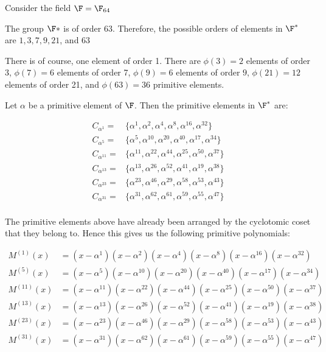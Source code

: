 \documentclass{homework}
\begin{document}
Consider the field $\F = \F_{64}$
\begin{problem}
  The group $\F*$ is of order $63$. Therefore, the possible
  orders of elements in  $\F^*$ are $1,3,7,9,21$, and $63$

  There is of course, one element of order 1. There are $ \phi(3)=2$ elements of
  order 3, $\phi(7) = 6$ elements of order 7, $\phi(9) = 6$ elements of order
  $9$, $\phi(21) = 12$ elements of order 21, and $\phi(63) = 36$ primitive
  elements.

\end{problem}

\begin{problem}
  Let $\alpha$ be a primitive element of $\F$. Then the primitive elements in
  $\F^*$
  are:

  \[
    \begin{aligned}
      C_{\alpha^1} = &\{\alpha^1,\alpha^{2}, \alpha^{4}, \alpha^{8}, \alpha^{16},
      \alpha^{32}\}\\
      C_{\alpha^5} = &\{\alpha^5,\alpha^{10}, \alpha^{20}, \alpha^{40}, \alpha^{17},
      \alpha^{34}\}\\
      C_{\alpha^{11}} = &\{\alpha^{11},\alpha^{22}, \alpha^{44}, \alpha^{25}, \alpha^{50},
      \alpha^{37}\}\\
      C_{\alpha^{13}} = &\{\alpha^{13},\alpha^{26}, \alpha^{52}, \alpha^{41}, \alpha^{19},
      \alpha^{38}\}\\
      C_{\alpha^{23}} = &\{\alpha^{23},\alpha^{46}, \alpha^{29}, \alpha^{58}, \alpha^{53},
      \alpha^{43}\}\\
      C_{\alpha^{31}} = &\{\alpha^{31},\alpha^{62}, \alpha^{61}, \alpha^{59}, \alpha^{55},
      \alpha^{47}\}\\
    \end{aligned}
  \]

  The primitive elements above have already been arranged by the cyclotomic
  coset that they belong to. Hence this gives us the following primitive
  polynomials:

  \[
    \begin{aligned}
      M^{(1)}(x) &=
      (x-\alpha^{1})(x-\alpha^{2})(x-\alpha^{4})(x-\alpha^{8})(x-\alpha^{16})(x-\alpha^{32})\\
      M^{(5)}(x) &=
      (x-\alpha^{5})(x-\alpha^{10})(x-\alpha^{20})(x-\alpha^{40})(x-\alpha^{17})(x-\alpha^{34})\\
      M^{(11)}(x) &=
      (x-\alpha^{11})(x-\alpha^{22})(x-\alpha^{44})(x-\alpha^{25})(x-\alpha^{50})(x-\alpha^{37})\\
      M^{(13)}(x) &=
      (x-\alpha^{13})(x-\alpha^{26})(x-\alpha^{52})(x-\alpha^{41})(x-\alpha^{19})(x-\alpha^{38})\\
      M^{(23)}(x) &=
      (x-\alpha^{23})(x-\alpha^{46})(x-\alpha^{29})(x-\alpha^{58})(x-\alpha^{53})(x-\alpha^{43})\\
      M^{(31)}(x) &=
      (x-\alpha^{31})(x-\alpha^{62})(x-\alpha^{61})(x-\alpha^{59})(x-\alpha^{55})(x-\alpha^{47})
    \end{aligned}
  \]

\end{problem}
\end{document}
